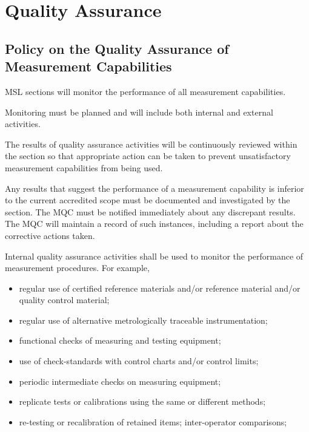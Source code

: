 \section{Quality Assurance}

\subsection{Policy on the Quality Assurance of Measurement Capabilities}
\label{ss:quality_assurance_policy}
MSL sections will monitor the performance of all measurement capabilities. 

Monitoring must be planned and will include both internal and external activities. 

The results of quality assurance activities will be continuously reviewed within the section so that appropriate action can be taken to prevent unsatisfactory measurement capabilities from being used. 

Any results that suggest the performance of a measurement capability is inferior to the current accredited scope must be documented and investigated by the section. The MQC must be notified immediately about any discrepant results. The MQC will maintain a record of such instances, including a report about the corrective actions taken. 

Internal quality assurance activities shall be used to monitor the performance of measurement procedures. For example, 
\begin{itemize}
\item	regular use of certified reference materials and/or reference material and/or quality control 
material;

\item	regular use of alternative metrologically traceable instrumentation;

\item	functional checks of measuring and testing equipment;

\item	use of check-standards with control charts and/or control limits;

\item	periodic intermediate checks on measuring equipment;

\item	replicate tests or calibrations using the same or different methods;

\item	re-testing or recalibration of retained items; inter-operator comparisons;    
\end{itemize}

